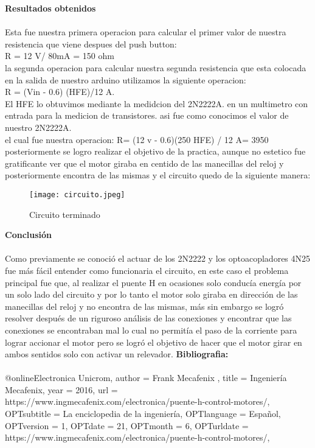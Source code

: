 \documentclass[12pt]{report}
\begin{document}
{\huge \textbf{Resultados obtenidos}\\}\\
{\large Esta fue nuestra primera operacion para calcular el primer valor de nuestra
resistencia que viene despues del push button:\\
R = 12 V/ 80mA = 150 ohm\\
la segunda operacion para calcular nuestra segunda resistencia que esta colocada
en la salida de nuestro arduino utilizamos la siguiente operacion:\\
R = (Vin - 0.6) (HFE)/12 A.\\
El HFE lo obtuvimos mediante la medidcion del 2N2222A. en un multimetro
con entrada para la medicion de transistores. asi fue como conocimos el valor
de nuestro 2N2222A.\\
el cual fue nuestra operacion: R= (12 v - 0.6)(250 HFE) / 12 A= 3950}\\
posteriormente se logro realizar el objetivo de la practica, aunque no estetico fue gratificante ver que el motor giraba en centido de las manecillas del reloj y posteriormente encontra de las mismas y el circuito quedo de la siguiente manera:
\begin{center}
 \begin{figure}[hbtp]
 \centering
 \texttt{[image: circuito.jpeg]}
 \caption{Circuito terminado}
 \end{figure}
 \newpage
 \end{center} 
{\huge \textbf{Conclusión}\\}\\
{\large Como previamente se conoció el actuar de los 2N2222 y los optoacopladores 4N25 fue más fácil entender como funcionaria el circuito, en este caso el problema principal fue que, al realizar el puente H en ocasiones solo conducía energía por un solo lado del circuito y por lo tanto el motor solo giraba en dirección de las manecillas del reloj y no encontra de las mismas, más sin embargo se logró resolver después de un riguroso análisis de las conexiones y encontrar que las conexiones se encontraban mal lo cual no permitía el paso de la corriente para lograr accionar el motor pero se logró el objetivo de hacer que el motor girar en ambos sentidos solo con activar un relevador.}
\newpage
{\huge \textbf{Bibliografia:}\\}\\
@online{Electronica Unicrom,
author = {Frank Mecafenix },
title = {Ingeniería Mecafenix},
year = {2016},
url = {https://www.ingmecafenix.com/electronica/puente-h-control-motores/},
OPTsubtitle = {La enciclopedia de la ingeniería},
OPTlanguage = {Español},
OPTversion = {1},
OPTdate = {21},
OPTmonth = {6},
OPTurldate = {https://www.ingmecafenix.com/electronica/puente-h-control-motores/},
}
\end{document}
